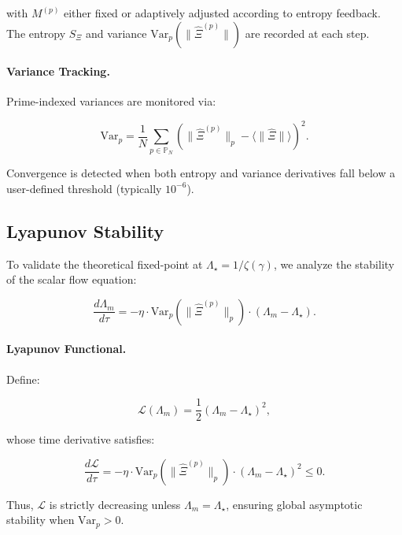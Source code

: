 \documentclass{article}
\theoremstyle{plain}
\theoremstyle{claimstyle}
\begin{document}
with $M^{(p)}$ either fixed or adaptively adjusted according to entropy feedback. The entropy $S_\Xi$ and variance $\text{Var}_p(\|\hat{\Xi}^{(p)}\|)$ are recorded at each step.

\paragraph{Variance Tracking.} Prime-indexed variances are monitored via:

\begin{equation}
\text{Var}_p = \frac{1}{N} \sum_{p \in \mathbb{P}_N} \left( \|\hat{\Xi}^{(p)}\|_p - \langle \|\hat{\Xi}\| \rangle \right)^2.
\end{equation}

Convergence is detected when both entropy and variance derivatives fall below a user-defined threshold (typically $10^{-6}$).

\subsection{Lyapunov Stability}

To validate the theoretical fixed-point at $\Lambda_\star = 1/\zeta(\gamma)$, we analyze the stability of the scalar flow equation:

\begin{equation}
\frac{d\Lambda_m}{d\tau} = -\eta \cdot \text{Var}_p(\|\hat{\Xi}^{(p)}\|_p) \cdot (\Lambda_m - \Lambda_\star).
\end{equation}

\paragraph{Lyapunov Functional.} Define:

\begin{equation}
\mathcal{L}(\Lambda_m) = \frac{1}{2}(\Lambda_m - \Lambda_\star)^2,
\end{equation}

whose time derivative satisfies:

\begin{equation}
\frac{d\mathcal{L}}{d\tau} = -\eta \cdot \text{Var}_p(\|\hat{\Xi}^{(p)}\|_p) \cdot (\Lambda_m - \Lambda_\star)^2 \leq 0.
\end{equation}

Thus, $\mathcal{L}$ is strictly decreasing unless $\Lambda_m = \Lambda_\star$, ensuring global asymptotic stability when $\text{Var}_p > 0$.
\end{document}
